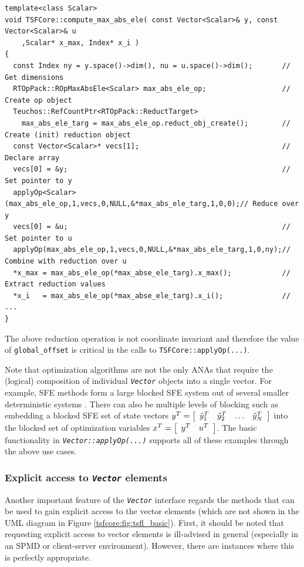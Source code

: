 {\scriptsize\begin{verbatim}
template<class Scalar>
void TSFCore::compute_max_abs_ele( const Vector<Scalar>& y, const Vector<Scalar>& u
    ,Scalar* x_max, Index* x_i )
{
  const Index ny = y.space()->dim(), nu = u.space()->dim();       // Get dimensions
  RTOpPack::ROpMaxAbsEle<Scalar> max_abs_ele_op;                  // Create op object
  Teuchos::RefCountPtr<RTOpPack::ReductTarget>
    max_abs_ele_targ = max_abs_ele_op.reduct_obj_create();        // Create (init) reduction object
  const Vector<Scalar>* vecs[1];                                  // Declare array
  vecs[0] = &y;                                                   // Set pointer to y
  applyOp<Scalar>(max_abs_ele_op,1,vecs,0,NULL,&*max_abs_ele_targ,1,0,0);// Reduce over y
  vecs[0] = &u;                                                   // Set pointer to u
  applyOp(max_abs_ele_op,1,vecs,0,NULL,&*max_abs_ele_targ,1,0,ny);// Combine with reduction over u
  *x_max = max_abs_ele_op(*max_abse_ele_targ).x_max();            // Extract reduction values
  *x_i   = max_abs_ele_op(*max_abse_ele_targ).x_i();              // ...
}
\end{verbatim}}

{}\noindent{}The above reduction operation is not coordinate invariant
and therefore the value of {}\texttt{global\_offset} is critical in
the calls to {}\texttt{TSFCore\-::applyOp(\-...)}.

Note that optimization algorithms are not the only ANAs that require
the (logical) composition of individual {}\texttt{\textit{Vector}}
objects into a single vector.  For example, SFE methods form a large
blocked SFE system out of several smaller deterministic systems
{}\cite{ref:sfe}.  There can also be multiple levels of blocking such
as embedding a blocked SFE set of state vectors $y^T = \bmat{cccc}
\tilde{y}_1^T & \tilde{y}_2^T & \ldots & \tilde{y}_N^T \emat$ into the blocked set of
optimization variables $x^T = \bmat{cc} y^T & u^T \emat$.  The basic
functionality in {}\texttt{\textit{Vector\-::applyOp(\-...)}} supports
all of these examples through the above use cases.

%
\subsubsection{Explicit access to {}\texttt{\textit{Vector}} elements}
\label{tsfcore:sec:explicit_vec_access}
%

Another important feature of the {}\texttt{\textit{Vector}} interface
regards the methods that can be used to gain explicit access to the
vector elements (which are not shown in the UML diagram in Figure
{}\ref{tsfcore:fig:tsfl_basic}).  First, it should be noted that
requesting explicit access to vector elements is ill-advised in
general (especially in an SPMD or client-server environment).
However, there are instances where this is perfectly appropriate.

